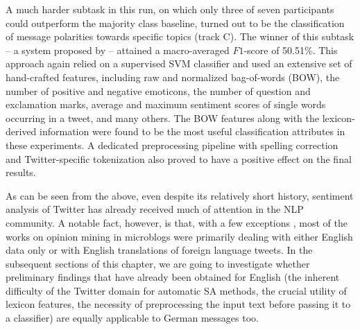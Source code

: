 A much harder subtask in this run, on which only three of seven
participants could outperform the majority class baseline, turned out
to be the classification of message polarities towards specific topics
(track C).  The winner of this subtask -- a system proposed by
\citet{Boag:15} -- attained a macro-averaged $F1$-score of 50.51\%.
This approach again relied on a supervised SVM classifier and used an
extensive set of hand-crafted features, including raw and normalized
bag-of-words (BOW), the number of positive and negative emoticons, the
number of question and exclamation marks, average and maximum
sentiment scores of single words occurring in a tweet, and many
others.  The BOW features along with the lexicon-derived information
were found to be the most useful classification attributes in these
experiments.  A dedicated preprocessing pipeline with spelling
correction and Twitter-specific tokenization also proved to have a
positive effect on the final results.

As can be seen from the above, even despite its relatively short
history, sentiment analysis of Twitter has already received much of
attention in the NLP community.  A notable fact, however, is that,
with a few exceptions \cite{Basile:13,Araque:15,Cesteros:15}, most of
the works on opinion mining in microblogs were primarily dealing with
either English data only or with English translations of foreign
language tweets.  In the subsequent sections of this chapter, we are
going to investigate whether preliminary findings that have already
been obtained for English (the inherent difficulty of the Twitter
domain for automatic SA methods, the crucial utility of lexicon
features, the necessity of preprocessing the input text before passing
it to a classifier) are equally applicable to German messages too.



